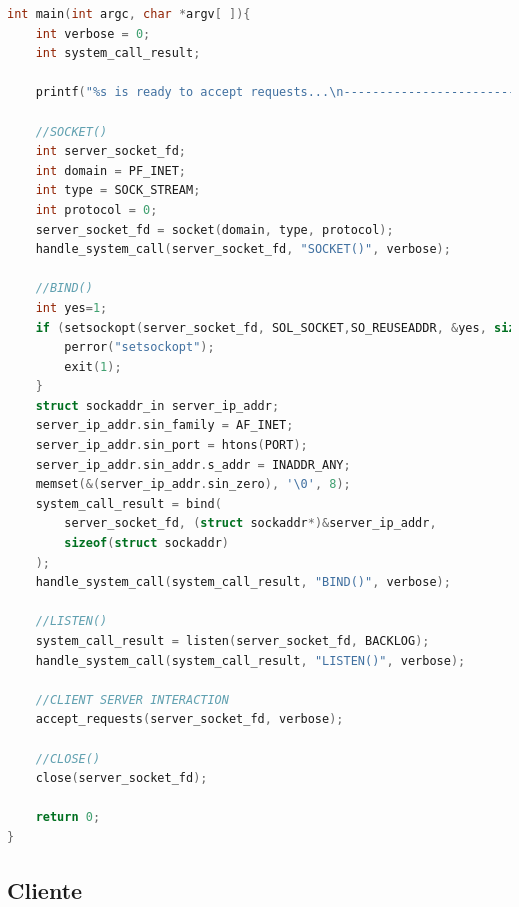 \documentclass{article}
\begin{document}
\begin{lstlisting}[language=c]
int main(int argc, char *argv[ ]){
    int verbose = 0;
    int system_call_result;

    printf("%s is ready to accept requests...\n-----------------------------------------\n\n", ENTITY);

    //SOCKET()
    int server_socket_fd;
    int domain = PF_INET;
    int type = SOCK_STREAM;
    int protocol = 0;
    server_socket_fd = socket(domain, type, protocol);
    handle_system_call(server_socket_fd, "SOCKET()", verbose);

    //BIND()
    int yes=1;
    if (setsockopt(server_socket_fd, SOL_SOCKET,SO_REUSEADDR, &yes, sizeof yes) == -1) {
        perror("setsockopt");
        exit(1);
    }
    struct sockaddr_in server_ip_addr;
    server_ip_addr.sin_family = AF_INET;
    server_ip_addr.sin_port = htons(PORT);
    server_ip_addr.sin_addr.s_addr = INADDR_ANY;
    memset(&(server_ip_addr.sin_zero), '\0', 8);
    system_call_result = bind(
        server_socket_fd, (struct sockaddr*)&server_ip_addr, 
        sizeof(struct sockaddr)
    );
    handle_system_call(system_call_result, "BIND()", verbose);

    //LISTEN()
    system_call_result = listen(server_socket_fd, BACKLOG);
    handle_system_call(system_call_result, "LISTEN()", verbose);

    //CLIENT SERVER INTERACTION
    accept_requests(server_socket_fd, verbose);

    //CLOSE()
    close(server_socket_fd);

    return 0;
}\end{lstlisting}


\subsection{Cliente}
\end{document}
